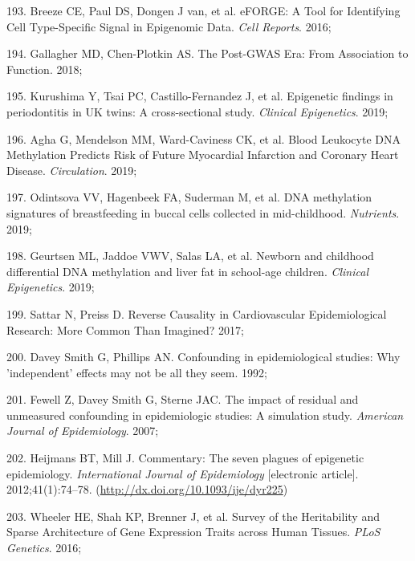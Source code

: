 \documentclass[11pt,oneside]{bristolthesis}
\newenvironment{cslreferences}%
  {}%
  {\par}
\begin{document}
\begin{cslreferences}
\leavevmode\hypertarget{ref-Breeze2016}{}%
193. Breeze CE, Paul DS, Dongen J van, et al. eFORGE: A Tool for Identifying Cell Type-Specific Signal in Epigenomic Data. \emph{Cell Reports}. 2016;

\leavevmode\hypertarget{ref-Gallagher2018}{}%
194. Gallagher MD, Chen-Plotkin AS. The Post-GWAS Era: From Association to Function. 2018;

\leavevmode\hypertarget{ref-Kurushima2019}{}%
195. Kurushima Y, Tsai PC, Castillo-Fernandez J, et al. Epigenetic findings in periodontitis in UK twins: A cross-sectional study. \emph{Clinical Epigenetics}. 2019;

\leavevmode\hypertarget{ref-Agha2019}{}%
196. Agha G, Mendelson MM, Ward-Caviness CK, et al. Blood Leukocyte DNA Methylation Predicts Risk of Future Myocardial Infarction and Coronary Heart Disease. \emph{Circulation}. 2019;

\leavevmode\hypertarget{ref-Odintsova2019}{}%
197. Odintsova VV, Hagenbeek FA, Suderman M, et al. DNA methylation signatures of breastfeeding in buccal cells collected in mid-childhood. \emph{Nutrients}. 2019;

\leavevmode\hypertarget{ref-Geurtsen2019}{}%
198. Geurtsen ML, Jaddoe VWV, Salas LA, et al. Newborn and childhood differential DNA methylation and liver fat in school-age children. \emph{Clinical Epigenetics}. 2019;

\leavevmode\hypertarget{ref-Sattar2017}{}%
199. Sattar N, Preiss D. Reverse Causality in Cardiovascular Epidemiological Research: More Common Than Imagined? 2017;

\leavevmode\hypertarget{ref-DaveySmith1992}{}%
200. Davey Smith G, Phillips AN. Confounding in epidemiological studies: Why 'independent' effects may not be all they seem. 1992;

\leavevmode\hypertarget{ref-Fewell2007}{}%
201. Fewell Z, Davey Smith G, Sterne JAC. The impact of residual and unmeasured confounding in epidemiologic studies: A simulation study. \emph{American Journal of Epidemiology}. 2007;

\leavevmode\hypertarget{ref-Heijmans2012}{}%
202. Heijmans BT, Mill J. Commentary: The seven plagues of epigenetic epidemiology. \emph{International Journal of Epidemiology} {[}electronic article{]}. 2012;41(1):74--78. (\url{http://dx.doi.org/10.1093/ije/dyr225})

\leavevmode\hypertarget{ref-Wheeler2016}{}%
203. Wheeler HE, Shah KP, Brenner J, et al. Survey of the Heritability and Sparse Architecture of Gene Expression Traits across Human Tissues. \emph{PLoS Genetics}. 2016;


\end{cslreferences}
\end{document}
